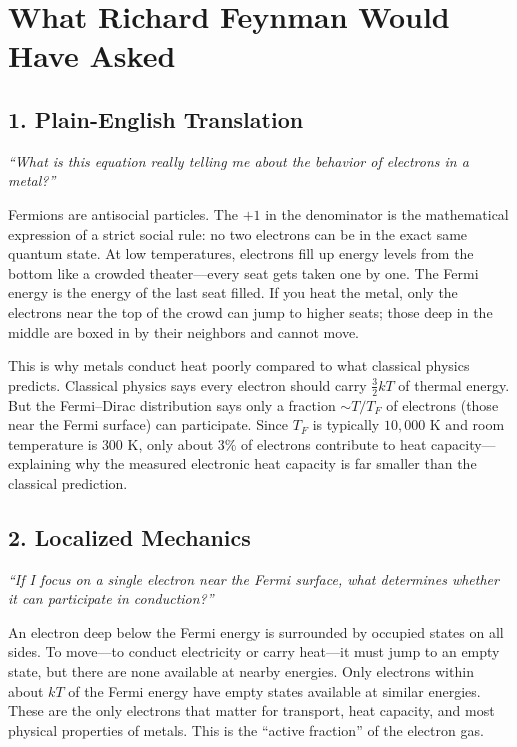\documentclass[11pt,openright]{book}
\begin{document}
\section*{What Richard Feynman Would Have Asked}

\subsection*{1. Plain-English Translation}
\textit{``What is this equation really telling me about the behavior of electrons in a metal?''}

Fermions are antisocial particles. The $+1$ in the denominator is the mathematical expression of a strict social rule: no two electrons can be in the exact same quantum state. At low temperatures, electrons fill up energy levels from the bottom like a crowded theater---every seat gets taken one by one. The Fermi energy is the energy of the last seat filled. If you heat the metal, only the electrons near the top of the crowd can jump to higher seats; those deep in the middle are boxed in by their neighbors and cannot move.

This is why metals conduct heat poorly compared to what classical physics predicts. Classical physics says every electron should carry $\frac{3}{2}kT$ of thermal energy. But the Fermi--Dirac distribution says only a fraction $\sim T/T_F$ of electrons (those near the Fermi surface) can participate. Since $T_F$ is typically $10{,}000$ K and room temperature is $300$ K, only about $3\%$ of electrons contribute to heat capacity---explaining why the measured electronic heat capacity is far smaller than the classical prediction.

\subsection*{2. Localized Mechanics}
\textit{``If I focus on a single electron near the Fermi surface, what determines whether it can participate in conduction?''}

An electron deep below the Fermi energy is surrounded by occupied states on all sides. To move---to conduct electricity or carry heat---it must jump to an empty state, but there are none available at nearby energies. Only electrons within about $kT$ of the Fermi energy have empty states available at similar energies. These are the only electrons that matter for transport, heat capacity, and most physical properties of metals. This is the ``active fraction'' of the electron gas.
\end{document}
